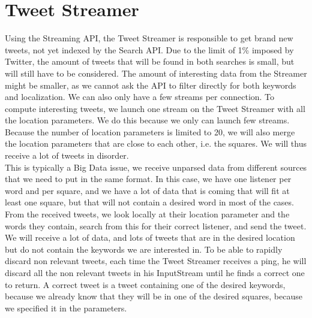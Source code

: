 \section{Tweet Streamer}
Using the Streaming API, the Tweet Streamer is responsible to get brand new tweets, not yet indexed by the Search API. Due to the limit of 1\% imposed by Twitter, the amount of tweets that will be found in both searches is small, but will still have to be considered. The amount of interesting data from the Streamer might be smaller, as we cannot ask the API to filter directly for both keywords and localization. We can also only have a few streams per connection. To compute interesting tweets, we launch one stream on the Tweet Streamer with all the location parameters. We do this because we only can launch few streams. Because the number of location parameters is limited to 20, we will also merge the location parameters that are close to each other, i.e. the squares. We will thus receive a lot of tweets in disorder. \\
This is typically a Big Data issue, we receive unparsed data from different sources that we need to put in the same format. In this case, we have one listener per word and per square, and we have a lot of data that is coming that will fit at least one square, but that will not contain a desired word in most of the cases.\\
From the received tweets, we look locally at their location parameter and the words they contain, search from this for their correct listener, and send the tweet. We will receive a lot of data, and lots of tweets that are in the desired location but do not contain the keywords we are interested in. To be able to rapidly discard non relevant tweets, each time the Tweet Streamer receives a ping, he will discard all the non relevant tweets in his InputStream until he finds a correct one to return. A correct tweet is a tweet containing one of the desired keywords, because we already know that they will be in one of the desired squares, because we specified it in the parameters.
